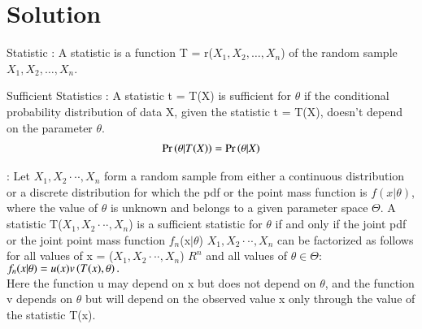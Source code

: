 \documentclass[journal,12pt,twocolumn]{IEEEtran}
\begin{document}
\section{Solution} 
\begin{definition}
     Statistic : A statistic is a function T = r($X_{1},X_{2},\dots,X_{n}$) of the random sample $X_{1},X_{2},\dots,X_{n}$.
   \end{definition}
   \begin{definition}
    Sufficient Statistics : A statistic t = T(X) is sufficient for $\theta$ if the conditional probability distribution of data X, given the statistic t = T(X), doesn't depend on the parameter $\theta$.
    \begin{align}
        \Pr\left(\theta \vert T(X)\right)=\Pr\left(\theta \vert X\right)
    \end{align}
   \end{definition}
   \begin{theorem}\label{factor}
    : Let $X_{1},X_{2} · · · , X_{n}$ form a random sample from either a continuous
distribution or a discrete distribution for which the pdf or the point mass function is $f(x\vert\theta)$,
where the value of $\theta$ is unknown and belongs to a given parameter space $\Theta$. A statistic
T($X_{1},X_{2} · · · , X_{n}$) is a sufficient statistic for $\theta$ if and only if the joint pdf or the joint point mass
function $f_{n}$(x$\vert\theta$) $X_{1},X_{2} · · · , X_{n}$ can be factorized as follows for all values of x = ($X_{1},X_{2} · · · , X_{n}$) \to
$R^{n}$ and all values of $\theta \in \Theta$:
$f_{n}(x\vert \theta) = u(x)v\left(T(x), \theta\right).$\\
Here the function u may depend on x but does not
depend on $\theta$, and the function v depends on $\theta$ but will depend on the observed value x only through the value of the statistic T(x).
   \end{theorem}
\end{document}
